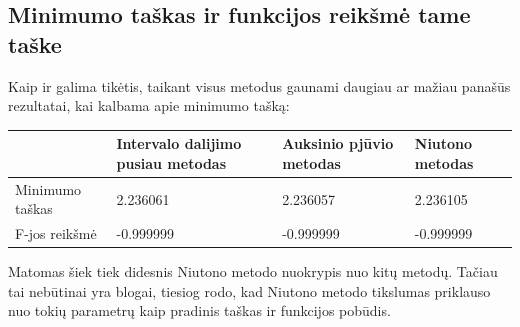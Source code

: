 \documentclass{article}
\begin{document}
\subsection{Minimumo taškas ir funkcijos reikšmė tame taške}
Kaip ir galima tikėtis, taikant visus metodus gaunami daugiau ar mažiau panašūs rezultatai, kai kalbama apie minimumo tašką:
\begin{table}[H]
    \centering
    \begin{tabular}{|p{3cm}|p{3cm}|p{3cm}|p{3cm}|}
    \hline
    \multicolumn{1}{|l|}{} & Intervalo dalijimo pusiau metodas & Auksinio pjūvio metodas & Niutono metodas \\ \hline
                       Minimumo taškas    & 2.236061 & 2.236057 & 2.236105 \\ \hline
                       F-jos reikšmė   & -0.999999 & -0.999999 & -0.999999 \\ \hline
    \end{tabular}
\end{table}
Matomas šiek tiek didesnis Niutono metodo nuokrypis nuo kitų metodų. Tačiau tai nebūtinai yra blogai, tiesiog rodo, kad Niutono metodo tikslumas priklauso nuo tokių parametrų kaip pradinis taškas ir funkcijos pobūdis.
\end{document}
